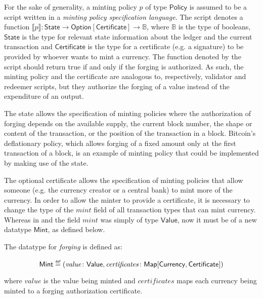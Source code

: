 \documentclass{llncs}
\newcommand{\defeq}{\mathrel{\overset{\makebox[0pt]{\mbox{\normalfont\tiny\sffamily def}}}{=}}}
\newcommand{\type}[1]{\mathsf{#1}}
\newcommand{\mapT}{\type{Map}}
\newcommand{\maybeT}{\type{Option}}
\newcommand{\valueT}{\type{Value}}
\newcommand{\currencyT}{\type{Currency}}
\newcommand{\stateT}{\type{State}}
\newcommand{\policyT}{\type{Policy}}
\newcommand{\certificateT}{\type{Certificate}}
\newcommand{\mintT}{\type{Mint}}
\newcommand{\field}[1]{\mathit{#1}}
\newcommand{\mint}{\field{mint}}
\newcommand{\val}{\field{value}}
\newcommand{\certificates}{\field{certificates}}
\newcommand{\interpret}[1]{\llbracket #1 \rrbracket}
\newenvironment{smallish}{
	\begin{small}
}{
	\end{small}
}
\begin{document}
For the sake of generality, a minting policy $p$ of type $\policyT$ is assumed to be a script written in a \emph{minting policy specification language}. The script denotes a function $\interpret{p}\colon \stateT \rightarrow \maybeT[\certificateT] \rightarrow \mathbb{B}$, where $\mathbb{B}$ is the type of booleans, $\stateT$ is the type for relevant state information about the ledger and the current transaction and $\certificateT$ is the type for a certificate (e.g. a signature) to be provided by whoever wants to mint a currency. The function denoted by the script should return true if and only if the forging is authorized. As such, the minting policy and the certificate are analogous to, respectively, validator and redeemer scripts, but they authorize the forging of a value instead of the expenditure of an output.

The state allows the specification of minting policies where the authorization of forging depends on the available supply, the current block number, the shape or content of the transaction, or the position of the transaction in a block. Bitcoin's deflationary policy, which allows forging of a fixed amount only at the first transaction of a block, is an example of minting policy that could be implemented by making use of the state.

The optional certificate allows the specification of minting policies that allow someone (e.g. the currency creator or a central bank) to mint more of the currency. In order to allow the minter to provide a certificate, it is necessary to change the type of the $\mint$ field of all transaction types that can mint currency. Whereas in \cite{ChimericLedgers} and \cite{UTxOScripts} the field $\mint$ was simply of type $\valueT$, now it must be of a new datatype $\mintT$, as defined below.


\begin{definition}
\label{def:Mint}
The datatype for \emph{forging} is defined as:
\begin{smallish}
\begin{equation*}
\mintT \defeq (\val\colon \valueT, \certificates\colon \mapT[\currencyT, \certificateT])
\end{equation*}
\end{smallish}
where $\val$ is the value being minted and $\certificates$ maps each currency being minted to a forging authorization certificate.
\end{definition}
\end{document}
